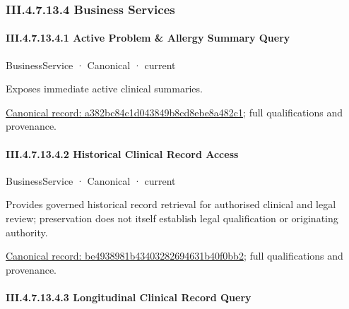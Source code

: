 \subsubsection*{III.4.7.13.4 Business Services}
\label{navigation:III.4.7.13.4}

\paragraph*{III.4.7.13.4.1 Active Problem \& Allergy Summary Query}
\label{navigation:III.4.7.13.4.1}

\label{element:a382bc84c1d043849b8cd8ebe8a482c1}
{\small BusinessService · Canonical · current}\par

Exposes immediate active clinical summaries.


{\footnotesize \href{../../../../continuum/business/business-service/a382bc84c1d043849b8cd8ebe8a482c1.md}{Canonical record: a382bc84c1d043849b8cd8ebe8a482c1}; full qualifications and provenance.}\par
\paragraph*{III.4.7.13.4.2 Historical Clinical Record Access}
\label{navigation:III.4.7.13.4.2}

\label{element:be4938981b43403282694631b40f0bb2}
{\small BusinessService · Canonical · current}\par

Provides governed historical record retrieval for authorised clinical and legal review; preservation does not itself establish legal qualification or originating authority.


{\footnotesize \href{../../../../continuum/business/business-service/be4938981b43403282694631b40f0bb2.md}{Canonical record: be4938981b43403282694631b40f0bb2}; full qualifications and provenance.}\par
\paragraph*{III.4.7.13.4.3 Longitudinal Clinical Record Query}
\label{navigation:III.4.7.13.4.3}

